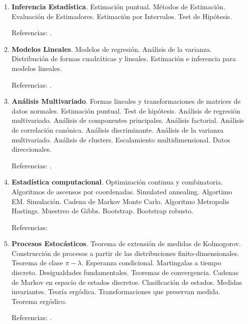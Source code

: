 \documentclass[a4paper, 12pt]{article}
\begin{document}
\begin{enumerate}



\item \textbf{Inferencia Estadística}.
Estimación puntual. Métodos de Estimación.
Evaluación de Estimadores.  Estimación por
Intervalos. Test de Hipótesis.

 

Referencias: \cite{bergero, bickel, degroot, lehmann,sen, rohatgi, scher}.



\item \textbf{Modelos Lineales}. Modelos de regresión. Análisis de la varianza. Distribución de formas cuadráticas y lineales. Estimación e inferencia para modelos lineales. 
 
 

 Referencias:  \cite{hock,  radrao, rawlyngs, scheffe, searle,  Venables, Montgonery}.
 
 
  

\item \textbf{Análisis Multivariado}. Formas lineales y transformaciones de matrices de datos normales. Estimación puntual. Test de hipótesis. Análisis de regresión multivariado. 
Análisis de componentes principales. Análisis factorial. Análisis de correlación canónica. Análisis discriminante. Análisis de la varianza multivariado. Análisis de clusters. Escalamiento multidimensional. Datos direccionales.

 
Referencias:  \cite{anderson, Everitt,  Hair, Jimenez2005,  Cuadras, mardia, Penia, johnson, Rencher}.







\item \textbf{Estadística computacional}. 
Optimización   continua y combinatoria. Algoritmos de ascensos por coordenadas. Simulated annealing. Algortimo EM. Simulación. Cadena de Markov Monte Carlo. Algoritmo Metropolis Hastings. Muestreo de Gibbs. Bootstrap. Bootstrap robusto.  


Referencias:    \cite{wrma, wrre, giho}




\item \textbf{Procesos Estocásticos}. Teorema de extensión de  medidas de Kolmogorov. Construcción de procesos a partir
de las distribuciones finito-dimensionales. Teorema de  clase $\pi-\lambda$. Esperanza condicional. Martingalas a tiempo
discreto. Desigualdades fundamentales. Teoremas de convergencia. Cadenas de Markov en espacio de estados discretos.
Clasificación de estados. Medidas invariantes. Teoría ergódica. Transformaciones que preservan medida. Teorema ergódico.

 

 Referencias: \cite{bremaud,ferrari, shir,   varadhan}.



\end{enumerate}



\end{document}
